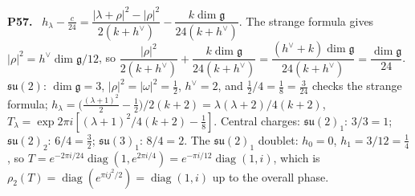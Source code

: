 \documentclass[11pt]{article}
\newenvironment{solution}[1]{\medskip\noindent\textbf{P#1.}\ }{\par\medskip}
\begin{document}
\begin{solution}{57}
$h_\lambda-\tfrac c{24} = \dfrac{|\lambda+\rho|^2-|\rho|^2}{2(k+h^\vee)}-\dfrac{k\dim\mathfrak g}{24(k+h^\vee)}$.
The strange formula gives $|\rho|^2 = h^\vee\dim\mathfrak g/12$, so
$\dfrac{|\rho|^2}{2(k+h^\vee)}+\dfrac{k\dim\mathfrak g}{24(k+h^\vee)}
= \dfrac{(h^\vee+k)\dim\mathfrak g}{24(k+h^\vee)} = \dfrac{\dim\mathfrak g}{24}$.
$\mathfrak{su}(2)$: $\dim\mathfrak g = 3$, $|\rho|^2 = |\omega|^2 = \tfrac12$,
$h^\vee = 2$, and $\tfrac12/4 = \tfrac18 = \tfrac3{24}$ checks the strange
formula; $h_\lambda = \big(\tfrac{(\lambda+1)^2}{2}-\tfrac12\big)/2(k+2) = \lambda(\lambda+2)/4(k+2)$,
$T_\lambda = \exp2\pi i[(\lambda+1)^2/4(k+2)-\tfrac18]$. Central charges:
$\mathfrak{su}(2)_1$: $3/3 = 1$; $\mathfrak{su}(2)_2$: $6/4 = \tfrac32$;
$\mathfrak{su}(3)_1$: $8/4 = 2$. The $\mathfrak{su}(2)_1$ doublet:
$h_0 = 0$, $h_1 = 3/12 = \tfrac14$, so
$T = e^{-2\pi i/24}\operatorname{diag}(1,e^{2\pi i/4}) = e^{-\pi i/12}\operatorname{diag}(1,i)$,
which is $\rho_2(T) = \operatorname{diag}(e^{\pi ij^2/2}) = \operatorname{diag}(1,i)$
up to the overall phase.
\end{solution}
\end{document}

